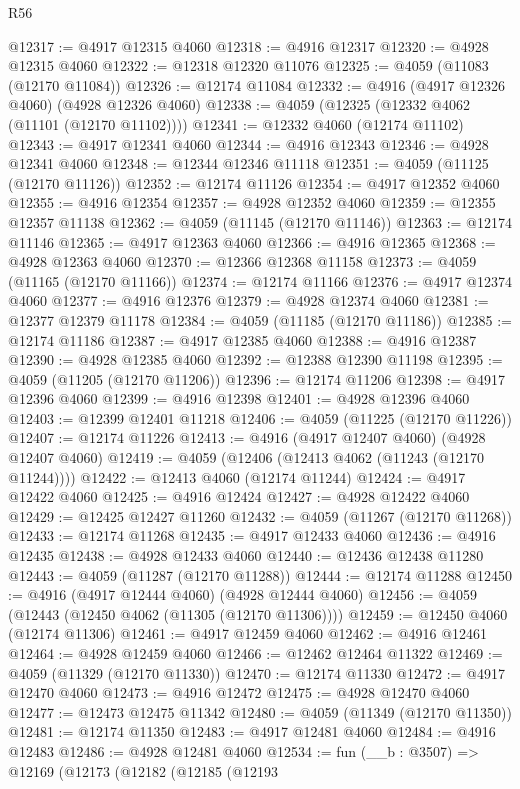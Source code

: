 \begin{lexlean}{R56}
\begin{coremodule}
@12317 := @4917 @12315 @4060
@12318 := @4916 @12317
@12320 := @4928 @12315 @4060
@12322 := @12318 @12320 @11076
@12325 := @4059 (@11083 (@12170 @11084))
@12326 := @12174 @11084
@12332 := @4916 (@4917 @12326 @4060) (@4928 @12326 @4060)
@12338 := @4059 (@12325 (@12332 @4062 (@11101 (@12170 @11102))))
@12341 := @12332 @4060 (@12174 @11102)
@12343 := @4917 @12341 @4060
@12344 := @4916 @12343
@12346 := @4928 @12341 @4060
@12348 := @12344 @12346 @11118
@12351 := @4059 (@11125 (@12170 @11126))
@12352 := @12174 @11126
@12354 := @4917 @12352 @4060
@12355 := @4916 @12354
@12357 := @4928 @12352 @4060
@12359 := @12355 @12357 @11138
@12362 := @4059 (@11145 (@12170 @11146))
@12363 := @12174 @11146
@12365 := @4917 @12363 @4060
@12366 := @4916 @12365
@12368 := @4928 @12363 @4060
@12370 := @12366 @12368 @11158
@12373 := @4059 (@11165 (@12170 @11166))
@12374 := @12174 @11166
@12376 := @4917 @12374 @4060
@12377 := @4916 @12376
@12379 := @4928 @12374 @4060
@12381 := @12377 @12379 @11178
@12384 := @4059 (@11185 (@12170 @11186))
@12385 := @12174 @11186
@12387 := @4917 @12385 @4060
@12388 := @4916 @12387
@12390 := @4928 @12385 @4060
@12392 := @12388 @12390 @11198
@12395 := @4059 (@11205 (@12170 @11206))
@12396 := @12174 @11206
@12398 := @4917 @12396 @4060
@12399 := @4916 @12398
@12401 := @4928 @12396 @4060
@12403 := @12399 @12401 @11218
@12406 := @4059 (@11225 (@12170 @11226))
@12407 := @12174 @11226
@12413 := @4916 (@4917 @12407 @4060) (@4928 @12407 @4060)
@12419 := @4059 (@12406 (@12413 @4062 (@11243 (@12170 @11244))))
@12422 := @12413 @4060 (@12174 @11244)
@12424 := @4917 @12422 @4060
@12425 := @4916 @12424
@12427 := @4928 @12422 @4060
@12429 := @12425 @12427 @11260
@12432 := @4059 (@11267 (@12170 @11268))
@12433 := @12174 @11268
@12435 := @4917 @12433 @4060
@12436 := @4916 @12435
@12438 := @4928 @12433 @4060
@12440 := @12436 @12438 @11280
@12443 := @4059 (@11287 (@12170 @11288))
@12444 := @12174 @11288
@12450 := @4916 (@4917 @12444 @4060) (@4928 @12444 @4060)
@12456 := @4059 (@12443 (@12450 @4062 (@11305 (@12170 @11306))))
@12459 := @12450 @4060 (@12174 @11306)
@12461 := @4917 @12459 @4060
@12462 := @4916 @12461
@12464 := @4928 @12459 @4060
@12466 := @12462 @12464 @11322
@12469 := @4059 (@11329 (@12170 @11330))
@12470 := @12174 @11330
@12472 := @4917 @12470 @4060
@12473 := @4916 @12472
@12475 := @4928 @12470 @4060
@12477 := @12473 @12475 @11342
@12480 := @4059 (@11349 (@12170 @11350))
@12481 := @12174 @11350
@12483 := @4917 @12481 @4060
@12484 := @4916 @12483
@12486 := @4928 @12481 @4060
@12534 := fun (__b : @3507) =>
  @12169
    (@12173
      (@12182
        (@12185
          (@12193

\end{coremodule}
\end{lexlean}
